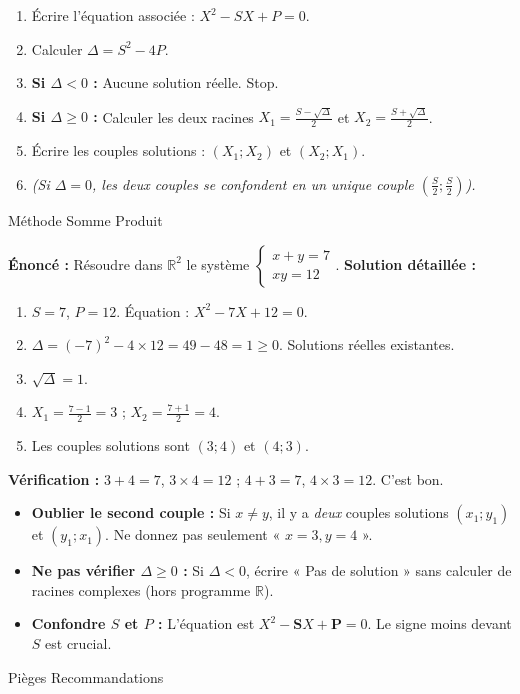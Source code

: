 \documentclass[11pt]{article}
\newcommand{\cle}[1]{{\popxbold\color{popdark}#1}}
\begin{document}
\begin{methode}[Résoudre un système symétrique $\begin{cases} x+y=S \\ xy=P \end{cases}$]
\begin{enumerate}
    \item Écrire l'équation associée : $X^2 - SX + P = 0$.
    \item Calculer $\Delta = S^2 - 4P$.
    \item \textbf{Si $\Delta < 0$ :} Aucune solution réelle. Stop.
    \item \textbf{Si $\Delta \geq 0$ :} Calculer les deux racines $X_1 = \frac{S - \sqrt{\Delta}}{2}$ et $X_2 = \frac{S + \sqrt{\Delta}}{2}$.
    \item Écrire les couples solutions : $(X_1 ; X_2)$ et $(X_2 ; X_1)$.
    \item \emph{(Si $\Delta = 0$, les deux couples se confondent en un unique couple $(\frac{S}{2} ; \frac{S}{2})$).}
\end{enumerate}
\cle{Méthode} \cle{Somme} \cle{Produit}
\end{methode}

\begin{exoresolu}
\textbf{Énoncé :} Résoudre dans $\mathbb{R}^2$ le système $\begin{cases} x + y = 7 \\ xy = 12 \end{cases}$.
\tcblower
\textbf{Solution détaillée :}
\begin{enumerate}
    \item $S = 7$, $P = 12$. Équation : $X^2 - 7X + 12 = 0$.
    \item $\Delta = (-7)^2 - 4 \times 12 = 49 - 48 = 1 \geq 0$. Solutions réelles existantes.
    \item $\sqrt{\Delta} = 1$.
    \item $X_1 = \frac{7 - 1}{2} = 3$ ; $X_2 = \frac{7 + 1}{2} = 4$.
    \item Les couples solutions sont $\boxed{(3 ; 4)}$ et $\boxed{(4 ; 3)}$.
\end{enumerate}
\textbf{Vérification :} $3+4=7$, $3\times4=12$ ; $4+3=7$, $4\times3=12$. C'est bon.
\end{exoresolu}

\begin{attention}
\begin{itemize}
    \item \textbf{Oublier le second couple :} Si $x \neq y$, il y a \emph{deux} couples solutions $(x_1;y_1)$ et $(y_1;x_1)$. Ne donnez pas seulement « $x=3, y=4$ ».
    \item \textbf{Ne pas vérifier $\Delta \geq 0$ :} Si $\Delta < 0$, écrire « Pas de solution » sans calculer de racines complexes (hors programme $\mathbb{R}$).
    \item \textbf{Confondre $S$ et $P$ :} L'équation est $X^2 - \mathbf{S}X + \mathbf{P} = 0$. Le signe moins devant $S$ est crucial.
\end{itemize}
\cle{Pièges} \cle{Recommandations}
\end{attention}
\end{document}
